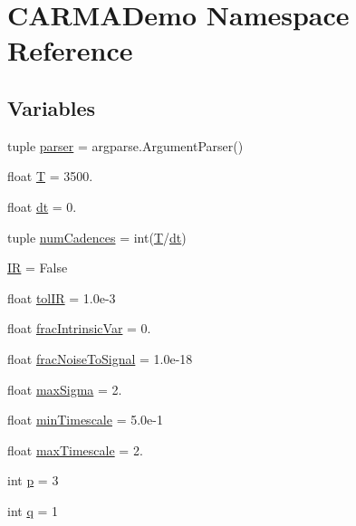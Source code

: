 \hypertarget{namespace_c_a_r_m_a_demo}{\section{C\-A\-R\-M\-A\-Demo Namespace Reference}
\label{namespace_c_a_r_m_a_demo}
}
\subsection*{Variables}
\begin{DoxyCompactItemize}
\item 
tuple \hyperlink{namespace_c_a_r_m_a_demo_a1fd1c8854d7c66e2b19f47d6aad706ef}{parser} = argparse.\-Argument\-Parser()
\item 
float \hyperlink{namespace_c_a_r_m_a_demo_ad48924984a4bff8b24fbada6f1e04893}{T} = 3500.
\item 
float \hyperlink{namespace_c_a_r_m_a_demo_a8de741bff9b4acb1631129ec80ee8306}{dt} = 0.
\item 
tuple \hyperlink{namespace_c_a_r_m_a_demo_a0bf150d4bd0d4b119fbe66ea9a3f5ebc}{num\-Cadences} = int(\hyperlink{namespace_c_a_r_m_a_demo_ad48924984a4bff8b24fbada6f1e04893}{T}/\hyperlink{namespace_c_a_r_m_a_demo_a8de741bff9b4acb1631129ec80ee8306}{dt})
\item 
\hyperlink{namespace_c_a_r_m_a_demo_a856e080e332bfee8400432bcbddadcf4}{I\-R} = False
\item 
float \hyperlink{namespace_c_a_r_m_a_demo_a8aa45a54b335d65f54192bc3fa3ba82d}{tol\-I\-R} = 1.\-0e-\/3
\item 
float \hyperlink{namespace_c_a_r_m_a_demo_a5054753a3c9b970a8bfd2e6cc5f7ff7d}{frac\-Intrinsic\-Var} = 0.
\item 
float \hyperlink{namespace_c_a_r_m_a_demo_a057d9699c5c2efec1048479312949b9c}{frac\-Noise\-To\-Signal} = 1.\-0e-\/18
\item 
float \hyperlink{namespace_c_a_r_m_a_demo_a39978964538dce54fa826abcdd34836f}{max\-Sigma} = 2.
\item 
float \hyperlink{namespace_c_a_r_m_a_demo_a0168215deb3ab933fe96dc4b55388cee}{min\-Timescale} = 5.\-0e-\/1
\item 
float \hyperlink{namespace_c_a_r_m_a_demo_a51a36b647ad9d55160c4fd3ebf5bb629}{max\-Timescale} = 2.
\item 
int \hyperlink{namespace_c_a_r_m_a_demo_adf3b3082a9cb9203add8b494f5932ba8}{p} = 3
\item 
int \hyperlink{namespace_c_a_r_m_a_demo_a71450e798960cbdb932b7f4721305832}{q} = 1

\end{DoxyCompactItemize}
